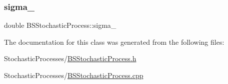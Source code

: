 \hypertarget{class_b_s_stochastic_process_aad38cd49eaf86dba80088e6a986a1ca5}{}\label{class_b_s_stochastic_process_aad38cd49eaf86dba80088e6a986a1ca5} 
\subsubsection{\texorpdfstring{sigma\+\_\+}{sigma\_}}
{\footnotesize\ttfamily double B\+S\+Stochastic\+Process\+::sigma\+\_\+}



The documentation for this class was generated from the following files\+:\begin{DoxyCompactItemize}
\item 
Stochastic\+Processes/\hyperlink{_b_s_stochastic_process_8h}{B\+S\+Stochastic\+Process.\+h}\item 
Stochastic\+Processes/\hyperlink{_b_s_stochastic_process_8cpp}{B\+S\+Stochastic\+Process.\+cpp}\end{DoxyCompactItemize}
